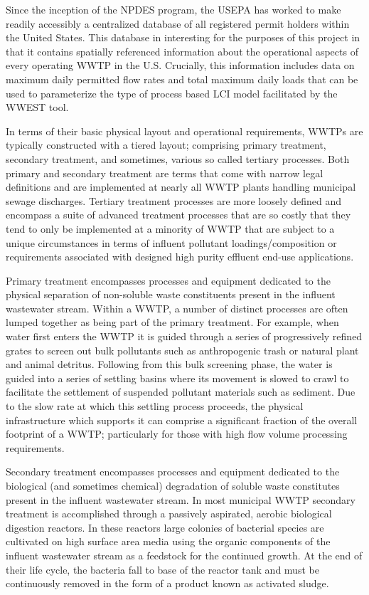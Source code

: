 Since the inception of the NPDES program, the USEPA has worked to make readily accessibly a centralized database of all registered permit holders within the United States. This database in interesting for the purposes of this project in that it contains spatially referenced information about the operational aspects of every operating WWTP in the U.S. Crucially, this information includes data on maximum daily permitted flow rates and total maximum daily loads that can be used to parameterize the type of process based LCI model facilitated by the WWEST tool.

In terms of their basic physical layout and operational requirements, WWTPs are typically constructed with a tiered layout; comprising primary treatment, secondary treatment, and sometimes, various so called tertiary processes. Both primary and secondary treatment are terms that come with narrow legal definitions and are implemented at nearly all WWTP plants handling municipal sewage discharges. Tertiary treatment processes are more loosely defined and encompass a suite of advanced treatment processes that are so costly that they tend to only be implemented at a minority of WWTP that are subject to a unique  circumstances in terms of influent pollutant loadings/composition or requirements associated with designed high purity effluent end-use applications.

Primary treatment encompasses processes and equipment dedicated to the physical separation of non-soluble waste constituents present in the influent wastewater stream. Within a WWTP, a number of distinct processes are often lumped together as being part of the primary treatment. For example, when water first enters the WWTP it is guided through a series of progressively refined grates to screen out bulk pollutants such as anthropogenic trash or natural plant and animal detritus. Following from this bulk screening phase, the water is guided into a series of settling basins where its movement is slowed to crawl to facilitate the settlement of suspended pollutant materials such as sediment. Due to the slow rate at which this settling process proceeds, the physical infrastructure which supports it can comprise a significant fraction of the overall footprint of a WWTP; particularly for those with high flow volume processing requirements.

Secondary treatment encompasses processes and equipment dedicated to the biological (and sometimes chemical) degradation of soluble waste constitutes present in the influent wastewater stream. In most municipal WWTP secondary treatment is accomplished through a passively aspirated, aerobic biological digestion reactors. In these reactors large colonies of bacterial species are cultivated on high surface area media using the organic components of the influent wastewater stream as a feedstock for the continued growth. At the end of their life cycle, the bacteria fall to base of the reactor tank and must be continuously removed in the form of a product known as activated sludge.

